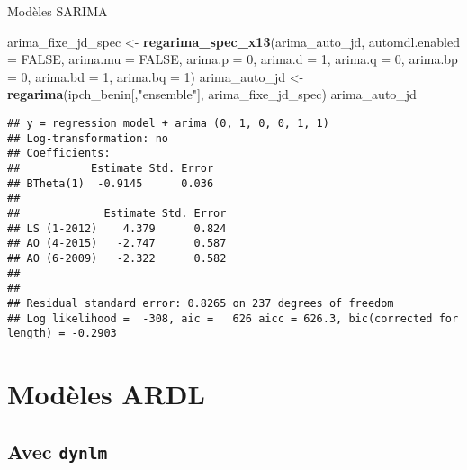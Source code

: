 \documentclass[10pt,xcolor=table,color={dvipsnames,usenames},ignorenonframetext,usepdftitle=false,french]{beamer}
\newenvironment{Shaded}{\begin{snugshade}}{\end{snugshade}}
\newcommand{\DataTypeTok}[1]{\textcolor[rgb]{0.13,0.29,0.53}{#1}}
\newcommand{\DecValTok}[1]{\textcolor[rgb]{0.00,0.00,0.81}{#1}}
\newcommand{\KeywordTok}[1]{\textcolor[rgb]{0.13,0.29,0.53}{\textbf{#1}}}
\newcommand{\NormalTok}[1]{#1}
\newcommand{\OtherTok}[1]{\textcolor[rgb]{0.56,0.35,0.01}{#1}}
\newcommand{\StringTok}[1]{\textcolor[rgb]{0.31,0.60,0.02}{#1}}
\begin{document}
\begin{frame}[fragile]{Modèles SARIMA}
\protect\hypertarget{moduxe8les-sarima-5}{}

\footnotesize

\begin{Shaded}
\begin{Highlighting}[]
\NormalTok{arima_fixe_jd_spec <-}\StringTok{ }
\StringTok{  }\KeywordTok{regarima_spec_x13}\NormalTok{(arima_auto_jd,}
                    \DataTypeTok{automdl.enabled =} \OtherTok{FALSE}\NormalTok{,}
                    \DataTypeTok{arima.mu =} \OtherTok{FALSE}\NormalTok{,}
                    \DataTypeTok{arima.p =} \DecValTok{0}\NormalTok{, }\DataTypeTok{arima.d =} \DecValTok{1}\NormalTok{, }\DataTypeTok{arima.q =} \DecValTok{0}\NormalTok{,}
                    \DataTypeTok{arima.bp =} \DecValTok{0}\NormalTok{, }\DataTypeTok{arima.bd =} \DecValTok{1}\NormalTok{, }\DataTypeTok{arima.bq =} \DecValTok{1}\NormalTok{)}
\NormalTok{arima_auto_jd <-}\StringTok{ }\KeywordTok{regarima}\NormalTok{(ipch_benin[,}\StringTok{"ensemble"}\NormalTok{], }
\NormalTok{                          arima_fixe_jd_spec)}
\NormalTok{arima_auto_jd}
\end{Highlighting}
\end{Shaded}

\begin{verbatim}
## y = regression model + arima (0, 1, 0, 0, 1, 1)
## Log-transformation: no
## Coefficients:
##           Estimate Std. Error
## BTheta(1)  -0.9145      0.036
## 
##             Estimate Std. Error
## LS (1-2012)    4.379      0.824
## AO (4-2015)   -2.747      0.587
## AO (6-2009)   -2.322      0.582
## 
## 
## Residual standard error: 0.8265 on 237 degrees of freedom
## Log likelihood =  -308, aic =   626 aicc = 626.3, bic(corrected for length) = -0.2903
\end{verbatim}

\end{frame}

\hypertarget{moduxe8les-ardl}{%
\section{Modèles ARDL}\label{moduxe8les-ardl}}

\hypertarget{avec-dynlm}{%
\subsection{\texorpdfstring{Avec
\texttt{dynlm}}{Avec dynlm}}\label{avec-dynlm}}
\end{document}
